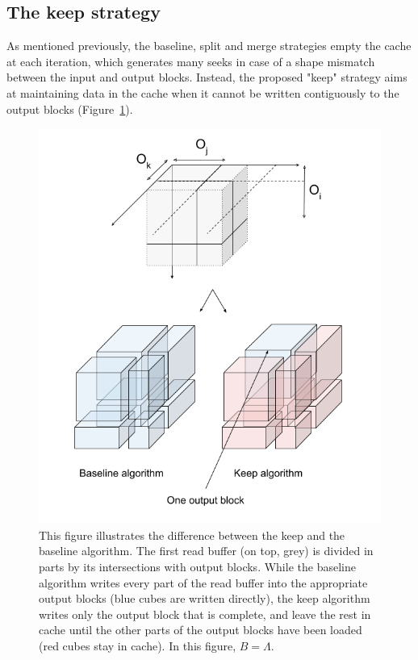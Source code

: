 \documentclass[sigconf, nonacm]{acmart}
\begin{document}
{\subsection{The keep strategy}
As mentioned previously, the baseline, split and merge strategies empty the
cache at each iteration, which generates many seeks in case of a shape
mismatch between the input and output blocks. Instead, the proposed "keep"
strategy aims at maintaining data in the cache when it cannot be written contiguously
to the output blocks (Figure~\ref{fig:keepvsbaseline}).

\begin{figure}[h]
\centering
\includegraphics[scale=0.4]{./figures/new/figure_2.png}
\caption{This figure illustrates the difference between the keep and the baseline algorithm.
The first read buffer (on top, grey) is divided in parts by its intersections with output blocks.
While the baseline algorithm writes every part of the read buffer into the appropriate output
blocks (blue cubes are written directly), the keep algorithm writes only the output block
that is complete, and leave the rest in cache until the other parts of the output blocks have been
loaded (red cubes stay in cache). In this figure, $B=\Lambda$.
}
\label{fig:keepvsbaseline}
\end{figure}

}
\end{document}

